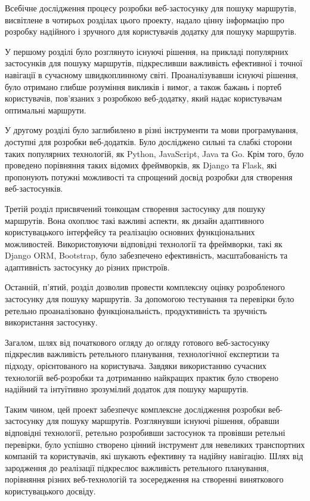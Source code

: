 \conclusions

Всебічне дослідження процесу розробки веб-застосунку для пошуку маршрутів, висвітлене в чотирьох розділах цього проекту, надало цінну інформацію про розробку надійного і зручного для користувачів додатку для пошуку маршрутів.

У першому розділі було розглянуто існуючі рішення, на прикладі популярних застосунків для пошуку маршрутів, підкресливши важливість ефективної і точної навігації в сучасному швидкоплинному світі. Проаналізувавши існуючі рішення, було отримано глибше розуміння викликів і вимог, а також бажань і портеб користувачів, пов'язаних з розробкою веб-додатку, який надає користувачам оптимальні маршрути.

У другому розділі було заглибилено в різні інструменти та мови програмування, доступні для розробки веб-додатків. Було досліджено сильні та слабкі сторони таких популярних технологій, як Python, JavaScript, Java та Go. Крім того, було проведено порівняння таких відомих фреймворків, як Django та Flask, які пропонують потужні можливості та спрощений досвід розробки для створення веб-застосунків.

Третій розділ присвячений тонкощам створення застосунку для пошуку маршрутів. Вона охоплює такі важливі аспекти, як дизайн адаптивного користувацького інтерфейсу та реалізацію основних функціональних можливостей. Використовуючи відповідні технології та фреймворки, такі як Django ORM, Bootstrap, було забезпечено ефективність, масштабованість та адаптивність застосунку до різних пристроїв.

Останній, п'ятий, розділ дозволив провести комплексну оцінку розробленого застосунку для пошуку маршрутів. За допомогою тестування та перевірки було ретельно проаналізовано функціональність, продуктивність та зручність використання застосунку.

Загалом, шлях від початкового огляду до огляду готового веб-застосунку підкреслив важливість ретельного планування, технологічної експертизи та підходу, орієнтованого на користувача. Завдяки використанню сучасних технологій веб-розробки та дотриманню найкращих практик було створено надійний та інтуїтивно зрозумілий додаток для пошуку маршрутів.

Таким чином, цей проект забезпечує комплексне дослідження розробки веб-застосунку для пошуку маршрутів. Розглянувши існуючі рішення, обравши відповідні технології, ретельно розробивши застосунок та провівши ретельні перевірки, було успішно створено цінний інструмент для невеликих транспортних компаній та користувачів, які шукають ефективну та надійну навігацію. Шлях від зародження до реалізації підкреслює важливість ретельного планування, порівняння різних веб-технологій та зосередження на створенні виняткового користувацького досвіду.